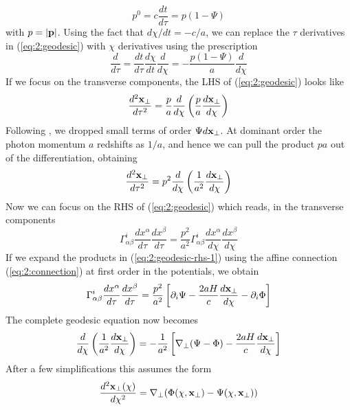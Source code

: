 \begin{equation}
\label{eq:2:nullconstr}
p^0 = c\frac{dt}{d\tau} = p(1-\Psi)
\end{equation} 
%
with $p=\vert\mathbf{p}\vert$. Using the fact that $d\chi/dt = -c/a$, we can replace the $\tau$ derivatives in (\ref{eq:2:geodesic}) with $\chi$ derivatives using the prescription
\begin{equation}
\label{eq:2:tau2chi}
\frac{d}{d\tau} = \frac{dt}{d\tau}\frac{d\chi}{dt}\frac{d}{d\chi} = -\frac{p(1-\Psi)}{a}\frac{d}{d\chi}
\end{equation}
%
If we focus on the transverse components, the LHS of (\ref{eq:2:geodesic}) looks like
\begin{equation}
\label{eq:2:geodesic-lhs-1}
\frac{d^2\mathbf{x}_\perp}{d\tau^2} = \frac{p}{a}\frac{d}{d\chi}\left(\frac{p}{a}\frac{d\mathbf{x}_\perp}{d\chi}\right)
\end{equation}
%
Following \citep{Dodelson-C11}, we dropped small terms of order $\Psi d\mathbf{x}_\perp$. At dominant order the photon momentum $a$ redshifts as $1/a$, and hence we can pull the product $pa$ out of the differentiation, obtaining 
\begin{equation}
\label{eq:2:geodesic-lhs-2}
\frac{d^2\mathbf{x}_\perp}{d\tau^2} = p^2\frac{d}{d\chi}\left(\frac{1}{a^2}\frac{d\mathbf{x}_\perp}{d\chi}\right)
\end{equation}
%
Now we can focus on the RHS of (\ref{eq:2:geodesic}) which reads, in the transverse components
\begin{equation}
\label{eq:2:geodesic-rhs-1}
\Gamma_{\alpha\beta}^i \frac{d x^\alpha}{d\tau}\frac{d x^\beta}{d\tau} = \frac{p^2}{a^2} \Gamma_{\alpha\beta}^i \frac{d x^\alpha}{d\chi}\frac{d x^\beta}{d\chi}
\end{equation}
%
If we expand the products in (\ref{eq:2:geodesic-rhs-1}) using the affine connection (\ref{eq:2:connection}) at first order in the potentials, we obtain
\begin{equation}
\label{eq:2:geodesic-rhs-2}
\Gamma_{\alpha\beta}^i \frac{d x^\alpha}{d\tau}\frac{d x^\beta}{d\tau} = \frac{p^2}{a^2}\left[\partial_i\Psi-\frac{2aH}{c}\frac{d\mathbf{x}_\perp}{d\chi} -\partial_i\Phi \right]
\end{equation}
%
The complete geodesic equation now becomes 
\begin{equation}
\label{eq:2:geodesic-fo-1}
\frac{d}{d\chi}\left(\frac{1}{a^2}\frac{d\mathbf{x}_\perp}{d\chi}\right) = -\frac{1}{a^2}\left[\nabla_\perp(\Psi-\Phi)-\frac{2aH}{c}\frac{d\mathbf{x}_\perp}{d\chi}\right]
\end{equation}
%
After a few simplifications this assumes the form 
\begin{equation}
\label{eq:2:geodesic-fo-2}
\frac{d^2\mathbf{x}_\perp(\chi)}{d\chi^2} = \nabla_\perp(\Phi(\chi,\mathbf{x}_\perp)-\Psi(\chi,\mathbf{x}_\perp))
\end{equation}

